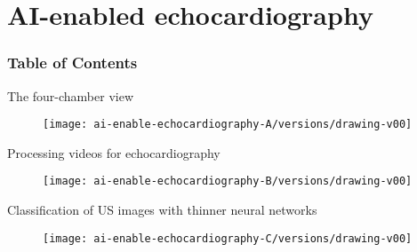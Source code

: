 
\section{AI-enabled echocardiography}


\begin{frame}
      \frametitle{Table of Contents}
      \tableofcontents[currentsection]
  \end{frame}


{

\begin{frame}{The four-chamber view}
      \begin{figure}
        \centering
        \texttt{[image: ai-enable-echocardiography-A/versions/drawing-v00]}
      \end{figure}
\end{frame}
}


{

\begin{frame}{Processing videos for echocardiography}
      \begin{figure}
        \centering
        \texttt{[image: ai-enable-echocardiography-B/versions/drawing-v00]}
      \end{figure}
\end{frame}
}


{

\begin{frame}{Classification of US images with thinner neural networks}
      \begin{figure}
        \centering
        \texttt{[image: ai-enable-echocardiography-C/versions/drawing-v00]}
      \end{figure}
\end{frame}
}

